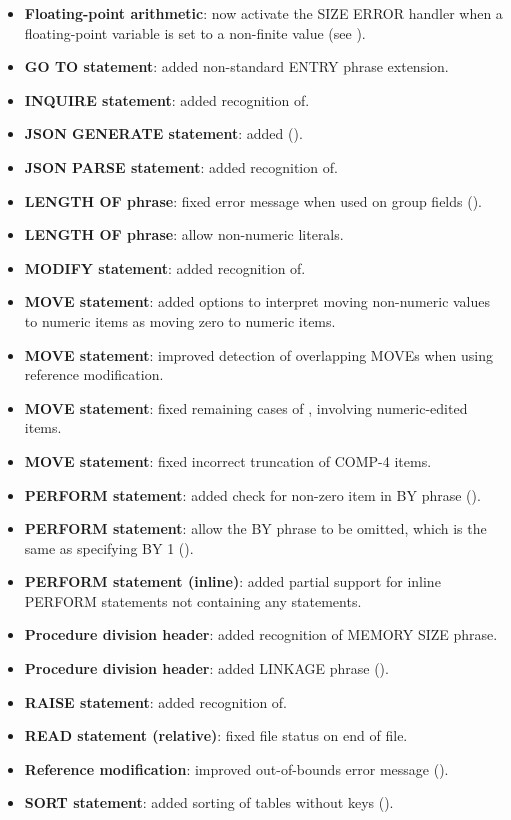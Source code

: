 \begin{itemize}
\item \textbf{Floating-point arithmetic}: now activate the SIZE ERROR handler when a floating-point variable is set to a non-finite value (see ).
\item \textbf{GO TO statement}: added non-standard ENTRY phrase extension.
\item \textbf{INQUIRE statement}: added recognition of.
\item \textbf{JSON GENERATE statement}: added ().
\item \textbf{JSON PARSE statement}: added recognition of.
\item \textbf{LENGTH OF phrase}: fixed error message when used on group fields ().
\item \textbf{LENGTH OF phrase}: allow non-numeric literals.
\item \textbf{MODIFY statement}: added recognition of.
\item \textbf{MOVE statement}: added options to interpret moving non-numeric values to numeric items as moving zero to numeric items.
\item \textbf{MOVE statement}: improved detection of overlapping MOVEs when using reference modification.
\item \textbf{MOVE statement}: fixed remaining cases of , involving numeric-edited items.
\item \textbf{MOVE statement}: fixed incorrect truncation of COMP-4 items.
\item \textbf{PERFORM statement}: added check for non-zero item in BY phrase ().
\item \textbf{PERFORM statement}: allow the BY phrase to be omitted, which is the same as specifying BY 1 ().
\item \textbf{PERFORM statement (inline)}: added partial support for inline PERFORM statements not containing any statements.
\item \textbf{Procedure division header}: added recognition of MEMORY SIZE phrase.
\item \textbf{Procedure division header}: added LINKAGE phrase ().
\item \textbf{RAISE statement}: added recognition of.
\item \textbf{READ statement (relative)}: fixed file status on end of file.
\item \textbf{Reference modification}: improved out-of-bounds error message ().
\item \textbf{SORT statement}: added sorting of tables without keys ().

\end{itemize}
